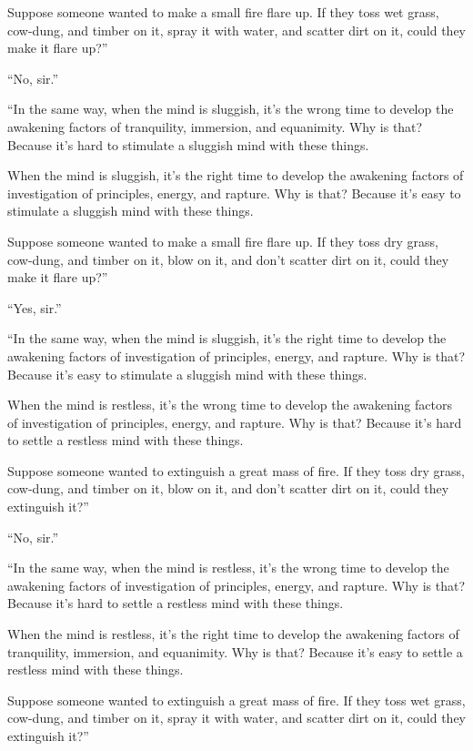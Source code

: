 \documentclass[12pt,openany]{book}%
\begin{document}
Suppose someone wanted to make a small fire flare up. If they toss wet grass, cow-dung, and timber on it, spray it with water, and scatter dirt on it, could they make it flare up?” 

“No, sir.” 

“In the same way, when the mind is sluggish, it’s the wrong time to develop the awakening factors of tranquility, immersion, and equanimity. Why is that? Because it’s hard to stimulate a sluggish mind with these things. 

When the mind is sluggish, it’s the right time to develop the awakening factors of investigation of principles, energy, and rapture. Why is that? Because it’s easy to stimulate a sluggish mind with these things. 

Suppose someone wanted to make a small fire flare up. If they toss dry grass, cow-dung, and timber on it, blow on it, and don’t scatter dirt on it, could they make it flare up?” 

“Yes, sir.” 

“In the same way, when the mind is sluggish, it’s the right time to develop the awakening factors of investigation of principles, energy, and rapture. Why is that? Because it’s easy to stimulate a sluggish mind with these things. 

When the mind is restless, it’s the wrong time to develop the awakening factors of investigation of principles, energy, and rapture. Why is that? Because it’s hard to settle a restless mind with these things. 

Suppose someone wanted to extinguish a great mass of fire. If they toss dry grass, cow-dung, and timber on it, blow on it, and don’t scatter dirt on it, could they extinguish it?” 

“No, sir.” 

“In the same way, when the mind is restless, it’s the wrong time to develop the awakening factors of investigation of principles, energy, and rapture. Why is that? Because it’s hard to settle a restless mind with these things. 

When the mind is restless, it’s the right time to develop the awakening factors of tranquility, immersion, and equanimity. Why is that? Because it’s easy to settle a restless mind with these things. 

Suppose someone wanted to extinguish a great mass of fire. If they toss wet grass, cow-dung, and timber on it, spray it with water, and scatter dirt on it, could they extinguish it?” 
\end{document}
